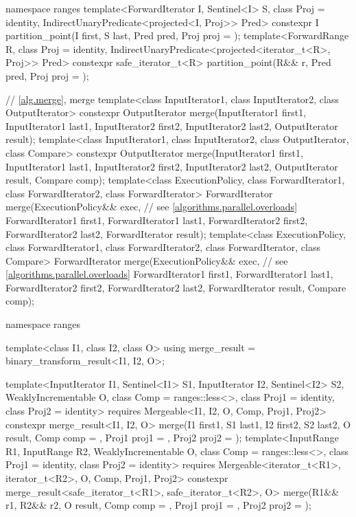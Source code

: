 \begin{codeblock}
{  namespace ranges {
    template<ForwardIterator I, Sentinel<I> S, class Proj = identity,
        IndirectUnaryPredicate<projected<I, Proj>> Pred>
      constexpr I partition_point(I first, S last, Pred pred, Proj proj = {});
    template<ForwardRange R, class Proj = identity,
        IndirectUnaryPredicate<projected<iterator_t<R>, Proj>> Pred>
      constexpr safe_iterator_t<R>
        partition_point(R&& r, Pred pred, Proj proj = {});
  }

  // \ref{alg.merge}, merge
  template<class InputIterator1, class InputIterator2, class OutputIterator>
    constexpr OutputIterator
      merge(InputIterator1 first1, InputIterator1 last1,
            InputIterator2 first2, InputIterator2 last2,
            OutputIterator result);
  template<class InputIterator1, class InputIterator2, class OutputIterator,
           class Compare>
    constexpr OutputIterator
      merge(InputIterator1 first1, InputIterator1 last1,
            InputIterator2 first2, InputIterator2 last2,
            OutputIterator result, Compare comp);
  template<class ExecutionPolicy, class ForwardIterator1, class ForwardIterator2,
           class ForwardIterator>
    ForwardIterator
      merge(ExecutionPolicy&& exec, // see \ref{algorithms.parallel.overloads}
            ForwardIterator1 first1, ForwardIterator1 last1,
            ForwardIterator2 first2, ForwardIterator2 last2,
            ForwardIterator result);
  template<class ExecutionPolicy, class ForwardIterator1, class ForwardIterator2,
           class ForwardIterator, class Compare>
    ForwardIterator
      merge(ExecutionPolicy&& exec, // see \ref{algorithms.parallel.overloads}
            ForwardIterator1 first1, ForwardIterator1 last1,
            ForwardIterator2 first2, ForwardIterator2 last2,
            ForwardIterator result, Compare comp);

  namespace ranges {
    template<class I1, class I2, class O>
    using merge_result = binary_transform_result<I1, I2, O>;

    template<InputIterator I1, Sentinel<I1> S1, InputIterator I2, Sentinel<I2> S2,
        WeaklyIncrementable O, class Comp = ranges::less<>, class Proj1 = identity,
        class Proj2 = identity>
      requires Mergeable<I1, I2, O, Comp, Proj1, Proj2>
      constexpr merge_result<I1, I2, O>
        merge(I1 first1, S1 last1, I2 first2, S2 last2, O result,
              Comp comp = {}, Proj1 proj1 = {}, Proj2 proj2 = {});
    template<InputRange R1, InputRange R2, WeaklyIncrementable O, class Comp = ranges::less<>,
        class Proj1 = identity, class Proj2 = identity>
      requires Mergeable<iterator_t<R1>, iterator_t<R2>, O, Comp, Proj1, Proj2>
      constexpr merge_result<safe_iterator_t<R1>, safe_iterator_t<R2>, O>
        merge(R1&& r1, R2&& r2, O result,
              Comp comp = {}, Proj1 proj1 = {}, Proj2 proj2 = {});
  }

}
\end{codeblock}
